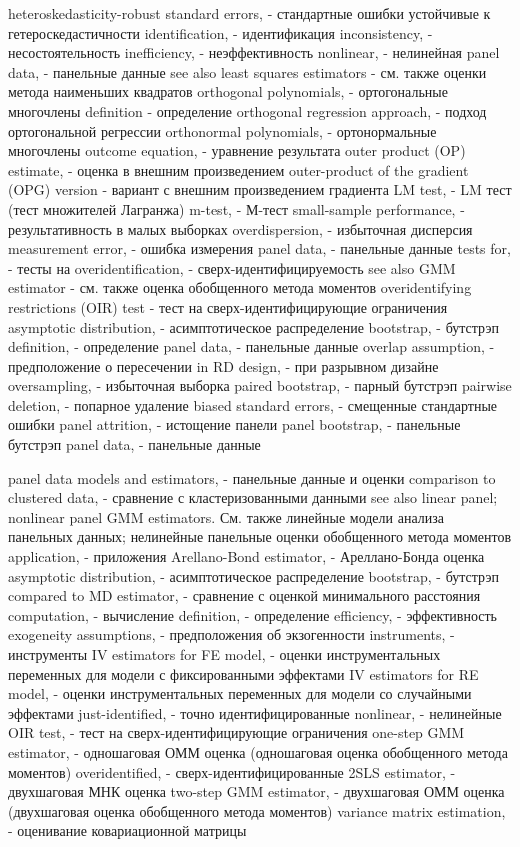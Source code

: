 heteroskedasticity-robust standard errors, - стандартные ошибки устойчивые к гетероскедастичности
identification, - идентификация
inconsistency, - несостоятельность
inefficiency, - неэффективность
nonlinear, - нелинейная
panel data, - панельные данные
see also least squares estimators - см. также оценки метода наименьших квадратов
orthogonal polynomials, - ортогональные многочлены
definition - определение
orthogonal regression approach, - подход ортогональной регрессии
orthonormal polynomials, - ортонормальные многочлены
outcome equation, - уравнение результата
outer product (OP) estimate, - оценка в внешним произведением
outer-product of the gradient (OPG) version - вариант с внешним произведением градиента
LM test, - LM тест (тест множителей Лагранжа)
m-test, - М-тест
small-sample performance, - результативность в малых выборках
overdispersion, - избыточная дисперсия
measurement error, - ошибка измерения
panel data, - панельные данные
tests for, - тесты на
overidentification, - сверх-идентифицируемость
see also GMM estimator - см. также оценка обобщенного метода моментов
overidentifying restrictions (OIR) test - тест на сверх-идентифицирующие ограничения
asymptotic distribution, - асимптотическое распределение
bootstrap, - бутстрэп
definition, - определение
panel data, - панельные данные
overlap assumption, - предположение о пересечении
in RD design, - при разрывном дизайне
oversampling, - избыточная выборка
paired bootstrap, - парный бутстрэп
pairwise deletion, - попарное удаление
biased standard errors, - смещенные стандартные ошибки
panel attrition, - истощение панели
panel bootstrap, - панельные бутстрэп
panel data, - панельные данные

panel data models and estimators, - панельные данные и оценки
comparison to clustered data, - сравнение с кластеризованными данными
see also linear panel; nonlinear panel GMM estimators. См. также линейные модели анализа панельных данных; нелинейные панельные оценки обобщенного метода моментов
application, - приложения
Arellano-Bond estimator, - Ареллано-Бонда оценка
asymptotic distribution, - асимптотическое распределение
bootstrap, - бутстрэп
compared to MD estimator, - сравнение с оценкой минимального расстояния
computation, - вычисление
definition, - определение
efficiency, - эффективность
exogeneity assumptions, - предположения об экзогенности
instruments, - инструменты
IV estimators for FE model, - оценки инструментальных переменных для модели с фиксированными эффектами
IV estimators for RE model, - оценки инструментальных переменных для модели со случайными эффектами
just-identified, - точно идентифицированные
nonlinear, - нелинейные
OIR test, - тест на сверх-идентифицирующие ограничения
one-step GMM estimator, - одношаговая ОММ оценка (одношаговая оценка обобщенного метода моментов)
overidentified, - сверх-идентифицированные
2SLS estimator, - двухшаговая МНК оценка
two-step GMM estimator, - двухшаговая ОММ оценка (двухшаговая оценка обобщенного метода моментов)
variance matrix estimation, - оценивание ковариационной матрицы

